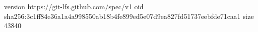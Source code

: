 version https://git-lfs.github.com/spec/v1
oid sha256:3c1ff84e36a1a4a998550ab18b4fe899ed5e07d9ea827fd51737eebfde71caa1
size 43840
